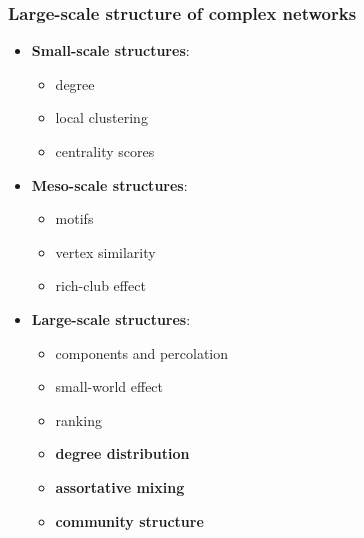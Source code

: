 \documentclass{beamer}
\begin{document}
\begin{frame}
    \frametitle{Large-scale structure of complex networks}
    \begin{itemize}
    \setlength\itemsep{1em}
        \item{{\bf Small-scale structures}: 
            \begin{itemize}
                \item{degree}
                \item{local clustering}
                \item{centrality scores}
            \end{itemize}
}
        \item{{\bf Meso-scale structures}: 
            \begin{itemize}
                \item{motifs}
                \item{vertex similarity}
                \item{rich-club effect}
            \end{itemize}
}
        \item{{\bf Large-scale structures}: 
                \begin{itemize}
                    \item{components and percolation}
                    \item{small-world effect}
                    \item{ranking}
                    \item{{\bf degree distribution}}
                    \item{{\bf assortative mixing}}
                    \item{{\bf community structure}}
                \end{itemize}
}
    \end{itemize}
    
\end{frame}
\end{document}
